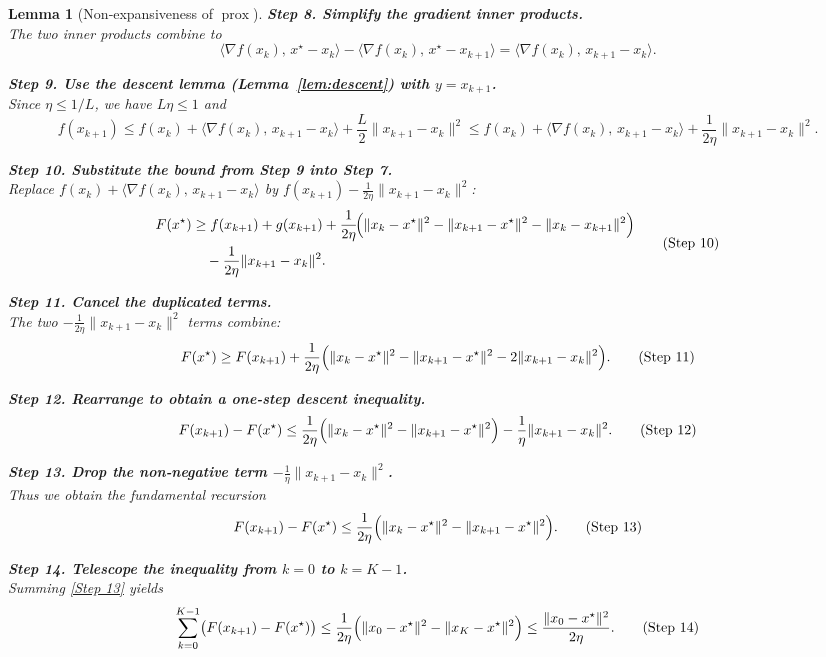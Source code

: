 \documentclass{article}
\newtheorem{lemma}{Lemma}
\newcommand{\prox}{\operatorname{prox}}
\newcommand{\grad}{\nabla}
\begin{document}
\begin{enumerate}[label={\arabic*.},noitemsep]
\begin{lemma}[Non‑expansiveness of $\prox$]
\noindent\textbf{Step 8. Simplify the gradient inner products.}\\
The two inner products combine to
\[
\big\langle\grad f(x_{k}),\,x^{\star}-x_{k}\big\rangle
-\big\langle\grad f(x_{k}),\,x^{\star}-x_{k+1}\big\rangle
= \big\langle\grad f(x_{k}),\,x_{k+1}-x_{k}\big\rangle.
\tag{Step 8}
\]

\noindent\textbf{Step 9. Use the descent lemma (Lemma~\ref{lem:descent}) with $y=x_{k+1}$.}\\
Since $\eta\le 1/L$, we have $L\eta\le1$ and
\[
f(x_{k+1})\le f(x_{k})+\big\langle\grad f(x_{k}),\,x_{k+1}-x_{k}\big\rangle
+\frac{L}{2}\|x_{k+1}-x_{k}\|^{2}
\le f(x_{k})+\big\langle\grad f(x_{k}),\,x_{k+1}-x_{k}\big\rangle
+\frac{1}{2\eta}\|x_{k+1}-x_{k}\|^{2}.
\tag{Step 9}
\]

\noindent\textbf{Step 10. Substitute the bound from Step 9 into Step 7.}\\
Replace $f(x_{k})+\big\langle\grad f(x_{k}),\,x_{k+1}-x_{k}\big\rangle$ by $f(x_{k+1})-\frac{1}{2\eta}\|x_{k+1}-x_{k}\|^{2}$:
\[
\begin{aligned}
F(x^{\star}) &\ge f(x_{k+1})+g(x_{k+1})
+\frac{1}{2\eta}\!\Bigl(\|x_{k}-x^{\star}\|^{2}
-\|x_{k+1}-x^{\star}\|^{2}
-\|x_{k}-x_{k+1}\|^{2}\Bigr)\\
&\quad-\frac{1}{2\eta}\|x_{k+1}-x_{k}\|^{2}.
\end{aligned}
\tag{Step 10}
\]

\noindent\textbf{Step 11. Cancel the duplicated terms.}\\
The two $-\frac{1}{2\eta}\|x_{k+1}-x_{k}\|^{2}$ terms combine:
\[
F(x^{\star})\ge F(x_{k+1})+\frac{1}{2\eta}
\Bigl(\|x_{k}-x^{\star}\|^{2}
-\|x_{k+1}-x^{\star}\|^{2}
-2\|x_{k+1}-x_{k}\|^{2}\Bigr).
\tag{Step 11}
\]

\noindent\textbf{Step 12. Rearrange to obtain a one‑step descent inequality.}\\
\[
F(x_{k+1})-F(x^{\star})
\le \frac{1}{2\eta}\Bigl(\|x_{k}-x^{\star}\|^{2}
-\|x_{k+1}-x^{\star}\|^{2}\Bigr)
-\frac{1}{\eta}\|x_{k+1}-x_{k}\|^{2}.
\tag{Step 12}
\]

\noindent\textbf{Step 13. Drop the non‑negative term $-\frac{1}{\eta}\|x_{k+1}-x_{k}\|^{2}$.}\\
Thus we obtain the fundamental recursion
\[
F(x_{k+1})-F(x^{\star})
\le \frac{1}{2\eta}\Bigl(\|x_{k}-x^{\star}\|^{2}
-\|x_{k+1}-x^{\star}\|^{2}\Bigr).
\tag{Step 13}
\]

\noindent\textbf{Step 14. Telescope the inequality from $k=0$ to $k=K-1$.}\\
Summing \eqref{Step 13} yields
\[
\sum_{k=0}^{K-1}\bigl(F(x_{k+1})-F(x^{\star})\bigr)
\le \frac{1}{2\eta}\Bigl(\|x_{0}-x^{\star}\|^{2}
-\|x_{K}-x^{\star}\|^{2}\Bigr)
\le \frac{\|x_{0}-x^{\star}\|^{2}}{2\eta}.
\tag{Step 14}
\]


\end{lemma}
\end{enumerate}
\end{document}
